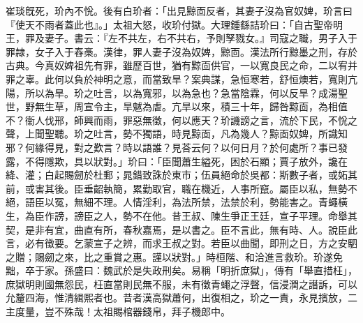 \begin{pinyinscope}
崔琰旣死，玠內不恱。後有白玠者：「出見黥靣反者，其妻子沒為官奴婢，玠言曰『使天不雨者蓋此也』。」太祖大怒，收玠付獄。大理鍾繇詰玠曰：「自古聖帝明王，罪及妻子。書云：『左不共左，右不共右，予則孥戮女。』司寇之職，男子入于罪隷，女子入于舂槀。漢律，罪人妻子沒為奴婢，黥靣。漢法所行黥墨之刑，存於古典。今真奴婢祖先有罪，雖歷百世，猶有黥靣供官，一以寬良民之命，二以宥并罪之辜。此何以負於神明之意，而當致旱？案典謀，急恒寒若，舒恒燠若，寬則亢陽，所以為旱。玠之吐言，以為寬邪，以為急也？急當陰霖，何以反旱？成湯聖世，野無生草，周宣令主，旱魃為虐。亢旱以來，積三十年，歸咎黥靣，為相值不？衞人伐邢，師興而雨，罪惡無徵，何以應天？玠譏謗之言，流於下民，不恱之聲，上聞聖聽。玠之吐言，勢不獨語，時見黥靣，凡為幾人？黥靣奴婢，所識知邪？何緣得見，對之歎言？時以語誰？見荅云何？以何日月？於何處所？事已發露，不得隱欺，具以狀對。」玠曰：「臣聞蕭生縊死，困於石顯；賈子放外，讒在絳、灌；白起賜劒於杜郵；晁錯致誅於東市；伍員絕命於吳都：斯數子者，或妬其前，或害其後。臣垂齠執簡，累勤取官，職在機近，人事所竄。屬臣以私，無勢不絕，語臣以冤，無細不理。人情淫利，為法所禁，法禁於利，勢能害之。青蠅橫生，為臣作謗，謗臣之人，勢不在他。昔王叔、陳生爭正王廷，宣子平理。命舉其契，是非有宜，曲直有所，春秋嘉焉，是以書之。臣不言此，無有時、人。說臣此言，必有徵要。乞蒙宣子之辨，而求王叔之對。若臣以曲聞，即刑之日，方之安駟之贈；賜劒之來，比之重賞之惠。謹以狀對。」時桓階、和洽進言救玠。玠遂免黜，卒于家。孫盛曰：魏武於是失政刑矣。易稱「明折庶獄」，傳有「舉直措枉」，庶獄明則國無怨民，枉直當則民無不服，未有徵青蠅之浮聲，信浸潤之譖訴，可以允釐四海，惟清緝熙者也。昔者漢高獄蕭何，出復相之，玠之一責，永見擯放，二主度量，豈不殊哉！太祖賜棺器錢帛，拜子機郎中。


\end{pinyinscope}
